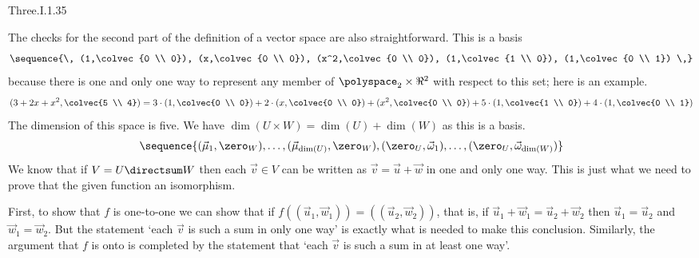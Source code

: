 \begin{ans}{Three.I.1.35}
\begin{exparts}
          The checks for the second part of the definition of a vector space
          are also straightforward.
        \partsitem This is a basis
          \begin{equation*}
            \sequence{\, (1,\colvec{0 \\ 0}), (x,\colvec{0 \\ 0}),
              (x^2,\colvec{0 \\ 0}), (1,\colvec{1 \\ 0}),
              (1,\colvec{0 \\ 1}) \,}
          \end{equation*}
          because there is one and only one way to represent any
          member of $\polyspace_2\times \Re^2$ with respect to this set;
          here is an example.
          \begin{equation*}
            (3+2x+x^2,\colvec{5 \\ 4})
             =
              3\cdot(1,\colvec{0 \\ 0})
              +2\cdot(x,\colvec{0 \\ 0})
              +(x^2,\colvec{0 \\ 0})
              +5\cdot(1,\colvec{1 \\ 0})
              +4\cdot(1,\colvec{0 \\ 1})
          \end{equation*}
          The dimension of this space is five.
        \partsitem We have \( \dim(U\times W)=\dim(U)+\dim(W) \)
          as this is a basis.
          \begin{equation*}
            \sequence{ (\vec{\mu}_1,\zero_W), \dots,
              (\vec{\mu}_{\dim(U)},\zero_W), (\zero_U,\vec{\omega}_1),
              \ldots,(\zero_U,\vec{\omega}_{\dim(W)}) }
          \end{equation*}
        \partsitem We know that if \( V=U\directsum W \) then each
          \( \vec{v}\in V \)
          can be written as \( \vec{v}=\vec{u}+\vec{w} \) in one and only one
          way.
          This is just what we need to prove that
          the given function an isomorphism.

          First, to show that \( f \) is one-to-one we can show that if
          \( f\left((\vec{u}_1,\vec{w}_1)\right)
                 =\left((\vec{u}_2,\vec{w}_2)\right) \), that is, if
          \( \vec{u}_1+\vec{w}_1=\vec{u}_2+\vec{w}_2 \) then
          \( \vec{u}_1=\vec{u}_2 \) and \( \vec{w}_1=\vec{w}_2 \).
          But the statement
          `each $\vec{v}$ is such a sum in only one way' is exactly what is
          needed to make this conclusion.
          Similarly, the argument that \( f \) is onto is completed by the
          statement that
          `each $\vec{v}$ is such a sum in at least one way'.


\end{exparts}
\end{ans}
